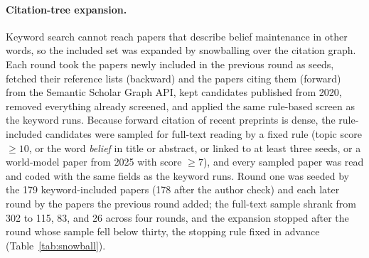 \paragraph{Citation-tree expansion.}
Keyword search cannot reach papers that describe belief maintenance in other words, so the included set was expanded by snowballing over the citation graph. Each round took the papers newly included in the previous round as seeds, fetched their reference lists (backward) and the papers citing them (forward) from the Semantic Scholar Graph API, kept candidates published from 2020, removed everything already screened, and applied the same rule-based screen as the keyword runs. Because forward citation of recent preprints is dense, the rule-included candidates were sampled for full-text reading by a fixed rule (topic score $\geq 10$, or the word \emph{belief} in title or abstract, or linked to at least three seeds, or a world-model paper from 2025 with score $\geq 7$), and every sampled paper was read and coded with the same fields as the keyword runs. Round one was seeded by the 179 keyword-included papers (178 after the author check) and each later round by the papers the previous round added; the full-text sample shrank from 302 to 115, 83, and 26 across four rounds, and the expansion stopped after the round whose sample fell below thirty, the stopping rule fixed in advance (Table~\ref{tab:snowball}).

\begin{table}[h]
\nattab[\footnotesize]
\setlength{\tabcolsep}{3pt}
\bcap
\label{tab:snowball}
\end{table}

